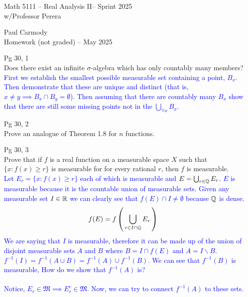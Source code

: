 \documentclass[10pt,a4paper]{report}
\newcommand{\CLASSNAME}{Math 5111 -- Real Analysis II}
\newcommand{\STUDENTNAME}{Paul Carmody}
\newcommand{\ASSIGNMENT}{Homework (not graded) }
\newcommand{\DUEDATE}{May 2025}
\newcommand{\SEMESTER}{Sprint 2025}
\newcommand{\BLUE}[1]{\textcolor{blue}{#1}}
\begin{document}
\begin{center}
	\Large{\CLASSNAME -- \SEMESTER} \\
	\large{ w/Professor Perera}
\end{center}
\begin{center}
	\STUDENTNAME \\
	\ASSIGNMENT -- \DUEDATE\\
\end{center} 


\HLINE
\noindent Pg 30, 1\\

Does there exist an infinite $\sigma$-algebra which has only countably many members?\\

\BLUE{First we establish the smallest possible measurable set containing a point, $B_x$.  Then demonstrate that these are unique and distinct (that is, $x \ne y \implies B_x \cap B_y = \emptyset$).  Then assuming that there are countably many $B_x$ show that there are still some missing points not in the $\bigcup_{\forall x} B_x$.
}


\HLINE
\noindent Pg 30, 2\\

Prove an analogue of Theorem 1.8 for $n$ functions.

\HLINE
\noindent Pg 30, 3\\

\noindent Prove that if $f$ is a real function on a measurable space $X$ such that $\{x:f(x) \ge r\}$ is measurable for for every rational $r$, then $f$ is measurable. \\

\BLUE{Let $E_r = \{x:f(x) \ge r\}$ each of which is measurable and $E = \bigcup_{r \in \mathbb{Q}} E_r$.  $E$ is measurable because it is the countable union of measurable sets.  Given any measurable set $I \in \mathbb{R}$ we can clearly see that $f(E) \cap I \ne \emptyset$ because $\mathbb{Q}$ is dense.
\begin{align*}
	f(E) &= f\left (\, \bigcup_{r\in I\cap \mathbb{Q}} E_r \,\right )
\end{align*}We are saying that $I$ is measurable, therefore it can be made up of the union of disjoint measurable sets $A$ and $B$ where $B = I \cap f(E)$ and $A = I\backslash B$.  $f^{-1}(I) = f^{-1}(A\cup B) = f^{-1}(A) \cup f^{-1}(B)$. We can see that $f^{-1}(B)$ is measurable,  How do we show that $f^{-1}(A)$ is?\\
\\
Notice, $E_r \in \mathfrak{M} \implies E_r^c \in \mathfrak{M}$.  Now, we can try to connect $f^{-1}(A)$ to these sets. 
}
\end{document}
